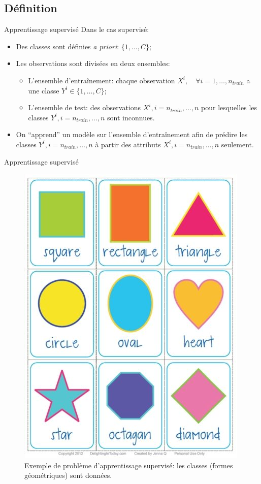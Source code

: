 \documentclass[8pt]{beamer}
\begin{document}
		\subsection{Définition}
			\begin{frame}{Apprentissage supervisé}
				Dans le cas supervisé:
				\begin{itemize}
					\item<1-> Des classes sont définies \textit{a priori}: \(\{1,\dots, C\}\);
					\item<2-> Les observations sont divisées en deux ensembles:
						\begin{itemize}
							\item<3-> L'ensemble d'entraînement: chaque observation \(X^i, \quad \forall i=1,\dots,n_{train}\) a une classe \(Y^i \in \{1,\dots, C\}\);
							\item<4-> L'ensemble de test: des observations \(X^i, i=n_{train},\dots,n\) pour lesquelles les classes \(Y^i, i=n_{train},\dots,n\) sont inconnues.
						\end{itemize}
					\item<5-> On ``apprend'' un modèle sur l'ensemble d'entraînement afin de prédire les classes \(Y^i, i=n_{train},\dots,n\) à partir des attributs \(X^i, i=n_{train},\dots,n\) seulement.
				\end{itemize}
			\end{frame}

			\begin{frame}{Apprentissage supervisé}
				\begin{figure}[H]
					\includegraphics[height=.55\textheight]{images/samples/shapes_supervised}
					\caption*{Exemple de problème d'apprentissage supervisé: les classes (formes géométriques) sont données.}
				\end{figure}
			\end{frame}
\end{document}
